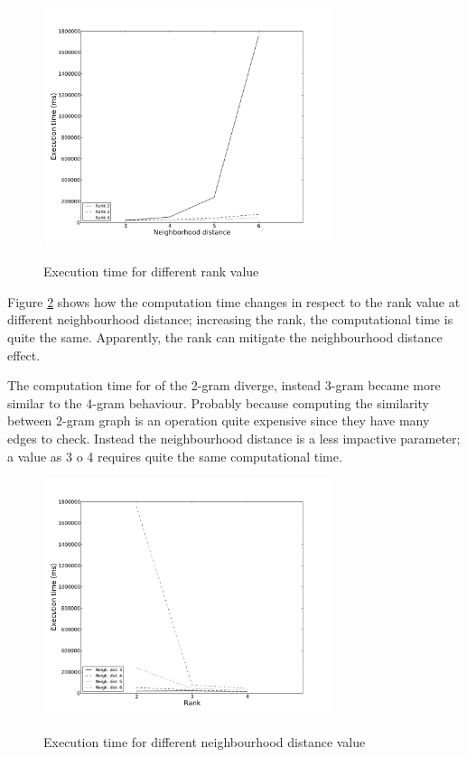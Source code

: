 \begin{figure}[htbp]
	\centering
			{\includegraphics[width=8.5cm,height=7cm]{image/win_2_ranks.pdf}}	
		\caption[et-fixed-10days-r-rank]{Execution time for different rank value}
	\label{fig:et-fixed-10days-r-rank}
\end{figure} 

Figure \ref{fig:et-fixed-10days-r-nd} shows how the computation time changes in respect to the rank value at different neighbourhood distance;
increasing the rank, the computational time is quite the same.
Apparently, the rank can mitigate the neighbourhood distance effect.

The computation time for of the 2-gram diverge, instead 3-gram became more similar to the 4-gram behaviour. 
Probably because computing the similarity between 2-gram graph is an operation quite expensive since they have many edges to check.
Instead the neighbourhood distance is a less impactive parameter; a value as 3 o 4 requires quite the same computational time.

\begin{figure}[htbp]
	\centering
			{\includegraphics[width=8.5cm,height=7cm]{image/win_2_ndists.pdf}}	
					\caption[et-fixed-10days-r-nd]{Execution time for different neighbourhood distance value}
	\label{fig:et-fixed-10days-r-nd}
\end{figure} 

